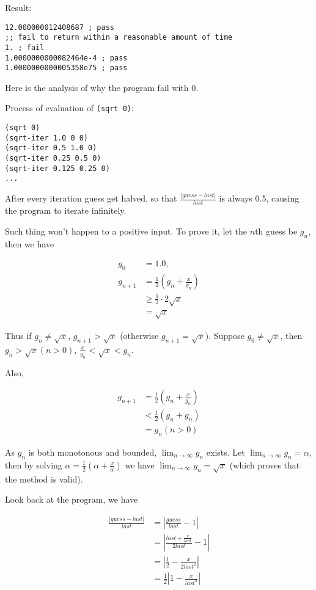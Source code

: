 \documentclass[../main.tex]{subfiles}
\begin{document}
Result:

\begin{lstlisting}
12.000000012408687 ; pass
;; fail to return within a reasonable amount of time
1. ; fail
1.0000000000082464e-4 ; pass
1.0000000000005358e75 ; pass
\end{lstlisting}

Here is the analysis of why the program fail with 0.

Process of evaluation of \lstinline{(sqrt 0)}:

\begin{lstlisting}
(sqrt 0)
(sqrt-iter 1.0 0 0)
(sqrt-iter 0.5 1.0 0)
(sqrt-iter 0.25 0.5 0)
(sqrt-iter 0.125 0.25 0)
...
\end{lstlisting}

After every iteration guess get halved, so that
 $\frac{|guess-last|}{last}$ is always 0.5,
 causing the program to iterate infinitely.

Such thing won't happen to a positive input. To prove it, let
 the $n$th guess be $g_n$, then we have
 
\begin{align*}
g_0 &= 1.0, \\
g_{n+1} &= \frac{1}{2}(g_n+\frac{x}{g_n}) \\
&\geq \frac{1}{2}\cdot2\sqrt{x} \\
&= \sqrt{x}
\end{align*}

Thus if $g_n \neq \sqrt{x}$, $g_{n+1} > \sqrt{x}$ (otherwise $g_{n+1} = \sqrt{x}$).
 Suppose $g_0 \neq \sqrt{x}$, then $g_n > \sqrt{x} (n > 0)$, $\frac{x}{g_n} <
 \sqrt{x} < g_n$.

Also,

\begin{align*}
g_{n+1} &= \frac{1}{2}(g_n+\frac{x}{g_n}) \\
&< \frac{1}{2}(g_n+g_n) \\
&= g_n (n > 0)
\end{align*}

As $g_n$ is both monotonous and bounded, $\lim_{n \to \infty}g_n$ exists.
 Let $\lim_{n \to \infty}g_n = \alpha$, then by solving
 $\alpha = \frac{1}{2}(\alpha+\frac{x}{\alpha})$ we have
 $\lim_{n \to \infty}g_n = \sqrt{x}$ (which proves that the method is valid).

Look back at the program, we have

\begin{align*}
\frac{|guess-last|}{last} &= |\frac{guess}{last} - 1| \\
&= |\frac{last + \frac{x}{last}}{2 last} - 1| \\
&= |\frac{1}{2} - \frac{x}{2 last^2}| \\
&= \frac{1}{2}|1-\frac{x}{last^2}|
\end{align*}
\end{document}
